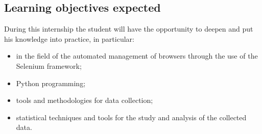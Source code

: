 \subsection{Learning objectives expected}
During this internship the student will have the opportunity to deepen and put his knowledge into practice, in particular:
\begin{itemize}
	\item in the field of the automated management of browsers through the use of the Selenium framework;
	\item Python programming;
	\item tools and methodologies for data collection; 
	\item statistical techniques and tools for the study and analysis of the collected data.
\end{itemize}
